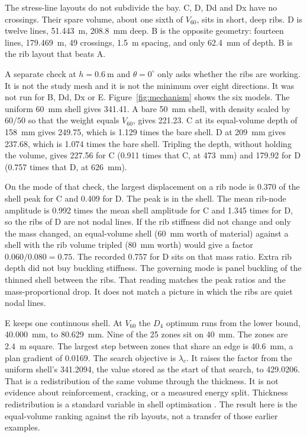 \documentclass[11pt,a4paper]{article}
\begin{document}
The stress-line layouts do not subdivide the bay.
C, D, Dd and Dx have no crossings.
Their spare volume, about one sixth of \(V_{60}\), sits in short, deep ribs.
D is twelve lines, 51.443~m, 208.8~mm deep.
B is the opposite geometry: fourteen lines, 179.469~m, 49 crossings, 1.5~m spacing, and only 62.4~mm of depth.
B is the rib layout that beats A.

A separate check at \(h = 0.6~\mathrm{m}\) and \(\theta = 0^{\circ}\) only asks whether the ribs are working.
It is not the study mesh and it is not the minimum over eight directions.
It was not run for B, Dd, Dx or E.
Figure~\ref{fig:mechanism} shows the six models.
The uniform 60~mm shell gives 341.41.
A bare 50~mm shell, with density scaled by \(60/50\) so that the weight equals \(V_{60}\), gives 221.23.
C at its equal-volume depth of 158~mm gives 249.75, which is 1.129 times the bare shell.
D at 209~mm gives 237.68, which is 1.074 times the bare shell.
Tripling the depth, without holding the volume, gives 227.56 for C (0.911 times that C, at 473~mm) and 179.92 for D (0.757 times that D, at 626~mm).

On the mode of that check, the largest displacement on a rib node is 0.370 of the shell peak for C and 0.409 for D.
The peak is in the shell.
The mean rib-node amplitude is 0.992 times the mean shell amplitude for C and 1.345 times for D, so the ribs of D are not nodal lines.
If the rib stiffness did not change and only the mass changed, an equal-volume shell (60~mm worth of material) against a shell with the rib volume tripled (80~mm worth) would give a factor \(0.060/0.080 = 0.75\).
The recorded 0.757 for D sits on that mass ratio.
Extra rib depth did not buy buckling stiffness.
The governing mode is panel buckling of the thinned shell between the ribs.
That reading matches the peak ratios and the mass-proportional drop.
It does not match a picture in which the ribs are quiet nodal lines.

E keeps one continuous shell.
At \(V_{60}\) the \(D_4\) optimum runs from the lower bound, 40.000~mm, to 80.629~mm.
Nine of the 25 zones sit on 40~mm.
The zones are 2.4~m square.
The largest step between zones that share an edge is 40.6~mm, a plan gradient of 0.0169.
The search objective is \(\lambda_c\).
It raises the factor from the uniform shell's 341.2094, the value stored as the start of that search, to 429.0206.
That is a redistribution of the same volume through the thickness.
It is not evidence about reinforcement, cracking, or a measured energy split.
Thickness redistribution is a standard variable in shell optimisation \citep{ramm1993}.
The result here is the equal-volume ranking against the rib layouts, not a transfer of those earlier examples.
\end{document}
